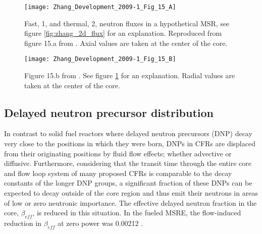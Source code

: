 \documentclass[review]{elsarticle}
\begin{document}
\begin{figure}[h]
   \centering
   \texttt{[image: Zhang\_Development\_2009-1\_Fig\_15\_A]}
   \caption{Fast, 1, and thermal, 2, neutron fluxes in a hypothetical MSR, see figure 
            \ref{fig:zhang_2d_flux} for an explanation. Reproduced from figure 15.a from
            \cite{zhang_development_2009-1}. 
               Axial
               values are taken at the center of the core.}
   \label{fig:zhang_axial_velocity_flux}
\end{figure}

\begin{figure}[h]
   \centering
   \texttt{[image: Zhang\_Development\_2009-1\_Fig\_15\_B]}
   \caption{Figure 15.b from \cite{zhang_development_2009-1}.
            See figure \ref{fig:zhang_axial_velocity_flux} for an explanation.
               Radial 
               values are taken at the center of the core.}
   \label{fig:zhang_radial_velocity_flux}
\end{figure}

\subsection{Delayed neutron precursor distribution} \label{ssec:dnpd}
In contrast to solid fuel reactors where delayed neutron precursors (DNP) decay
 very close to the positions in which they were born, DNPs in CFRs are displaced
 from their originating positions by fluid flow effects; whether advective or
 diffusive. Furthermore, considering that the transit time through the entire
 core and flow loop system of many proposed CFRs is comparable to the decay
 constants of the longer DNP groups, a significant fraction of these DNPs can be
expected to decay outside of the core region and thus emit their neutrons in areas
of low or zero neutronic importance. The effective delayed neutron fraction in the
 core, $\beta_{eff}$, is reduced in this situation. In the  fueled MSRE,
 the flow-induced reduction in $\beta_{eff}$ at zero power was 0.00212 \cite{delpech_benchmark_2003}.
\end{document}
